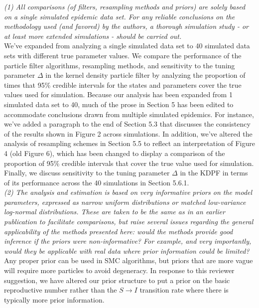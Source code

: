 \documentclass{article}
\begin{document}
\noindent \emph{(1) All comparisons (of filters, resampling methods and priors) are solely based on a single simulated epidemic data set. For any reliable conclusions on the methodology used (and favored) by the authors, a thorough simulation study - or at least more extended simulations - should be carried out.} \\

We've expanded from analyzing a single simulated data set to 40 simulated data sets with different true parameter values. We compare the performance of the particle filter algorithms, resampling methods, and sensitivity to the tuning parameter $\Delta$ in the kernel density particle filter by analyzing the proportion of times that 95\% credible intervals for the states and parameters cover the true values used for simulation. Because our analysis has been expanded from 1 simulated data set to 40, much of the prose in Section 5 has been edited to accommodate conclusions drawn from multiple simulated epidemics. For instance, we've added a paragraph to the end of Section 5.3 that discusses the consistency of the results shown in Figure 2 across simulations. In addition, we've altered the analysis of resampling schemes in Section 5.5 to reflect an interpretation of Figure 4 (old Figure 6), which has been changed to display a comparison of the proportion of 95\% credible intervals that cover the true value used for simulation. Finally, we discuss sensitivity to the tuning parameter $\Delta$ in the KDPF in terms of its performance across the 40 simulations in Section 5.6.1.  \\

\noindent \emph{(2) The analysis and estimation is based on very informative priors on the model parameters, expressed as narrow uniform distributions or matched low-variance log-normal distributions. These are taken to be the same as in an earlier publication to facilitate comparisons, but raise several issues regarding the general applicability of the methods presented here: would the methods provide good inference if the priors were non-informative? For example, and very importantly, would they be applicable with real data where prior information could be limited?} \\

Any proper prior can be used in SMC algorithms, but priors that are more vague will require more particles to avoid degeneracy.
In response to this reviewer suggestion, we have altered our prior structure to put a prior on the basic reproductive number rather than the $S\to I$ transition rate where there is typically more prior information. \\
\end{document}
